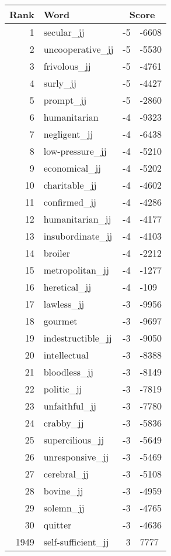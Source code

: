 \begin{longtable}[!htbp]{| rlr@{.}l |}
    \hline
    \textbf{Rank} & \textbf{Word} & \multicolumn{2}{c|}{\textbf{Score}} \\
    \hline
    \endhead
    1 & secular\_jj & -5 & -6608 \\
    2 & uncooperative\_jj & -5 & -5530 \\
    3 & frivolous\_jj & -5 & -4761 \\
    4 & surly\_jj & -5 & -4427 \\
    5 & prompt\_jj & -5 & -2860 \\
    6 & humanitarian & -4 & -9323 \\
    7 & negligent\_jj & -4 & -6438 \\
    8 & low-pressure\_jj & -4 & -5210 \\
    9 & economical\_jj & -4 & -5202 \\
    10 & charitable\_jj & -4 & -4602 \\
    11 & confirmed\_jj & -4 & -4286 \\
    12 & humanitarian\_jj & -4 & -4177 \\
    13 & insubordinate\_jj & -4 & -4103 \\
    14 & broiler & -4 & -2212 \\
    15 & metropolitan\_jj & -4 & -1277 \\
    16 & heretical\_jj & -4 & -109 \\
    17 & lawless\_jj & -3 & -9956 \\
    18 & gourmet & -3 & -9697 \\
    19 & indestructible\_jj & -3 & -9050 \\
    20 & intellectual & -3 & -8388 \\
    21 & bloodless\_jj & -3 & -8149 \\
    22 & politic\_jj & -3 & -7819 \\
    23 & unfaithful\_jj & -3 & -7780 \\
    24 & crabby\_jj & -3 & -5836 \\
    25 & supercilious\_jj & -3 & -5649 \\
    26 & unresponsive\_jj & -3 & -5469 \\
    27 & cerebral\_jj & -3 & -5108 \\
    28 & bovine\_jj & -3 & -4959 \\
    29 & solemn\_jj & -3 & -4765 \\
    30 & quitter & -3 & -4636 \\
    1949 & self-sufficient\_jj & 3 & 7777 \\

\end{longtable}
